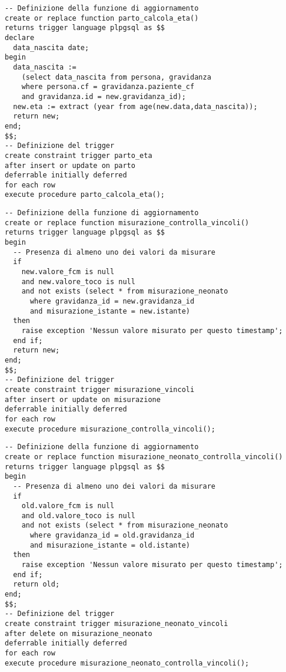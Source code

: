 \begin{lstlisting}[float,caption={Definizione del \emph{trigger} \tab{parto\_eta}.},label=ptrgpartoeta]
-- Definizione della funzione di aggiornamento
create or replace function parto_calcola_eta()
returns trigger language plpgsql as $$
declare
  data_nascita date;
begin
  data_nascita :=
    (select data_nascita from persona, gravidanza
    where persona.cf = gravidanza.paziente_cf
    and gravidanza.id = new.gravidanza_id);
  new.eta := extract (year from age(new.data,data_nascita));
  return new;
end;
$$;
-- Definizione del trigger
create constraint trigger parto_eta
after insert or update on parto
deferrable initially deferred
for each row
execute procedure parto_calcola_eta();
\end{lstlisting}

\begin{lstlisting}[float,caption={Definizione del \emph{trigger} \tab{misurazione\_vincoli}.},label=ptrgmisurazionevincoli]
-- Definizione della funzione di aggiornamento
create or replace function misurazione_controlla_vincoli()
returns trigger language plpgsql as $$
begin
  -- Presenza di almeno uno dei valori da misurare
  if
    new.valore_fcm is null
    and new.valore_toco is null
    and not exists (select * from misurazione_neonato
      where gravidanza_id = new.gravidanza_id
      and misurazione_istante = new.istante)
  then
    raise exception 'Nessun valore misurato per questo timestamp';
  end if;
  return new;
end;
$$;
-- Definizione del trigger
create constraint trigger misurazione_vincoli
after insert or update on misurazione
deferrable initially deferred
for each row
execute procedure misurazione_controlla_vincoli();
\end{lstlisting}

\begin{lstlisting}[float,caption={Definizione del \emph{trigger} \tab{misurazione\_neonato\_vincoli}.},label=ptrgmisurazioneneonatovincoli]
-- Definizione della funzione di aggiornamento
create or replace function misurazione_neonato_controlla_vincoli()
returns trigger language plpgsql as $$
begin
  -- Presenza di almeno uno dei valori da misurare
  if
    old.valore_fcm is null
    and old.valore_toco is null
    and not exists (select * from misurazione_neonato
      where gravidanza_id = old.gravidanza_id
      and misurazione_istante = old.istante)
  then
    raise exception 'Nessun valore misurato per questo timestamp';
  end if;
  return old;
end;
$$;
-- Definizione del trigger
create constraint trigger misurazione_neonato_vincoli
after delete on misurazione_neonato
deferrable initially deferred
for each row
execute procedure misurazione_neonato_controlla_vincoli();
\end{lstlisting}